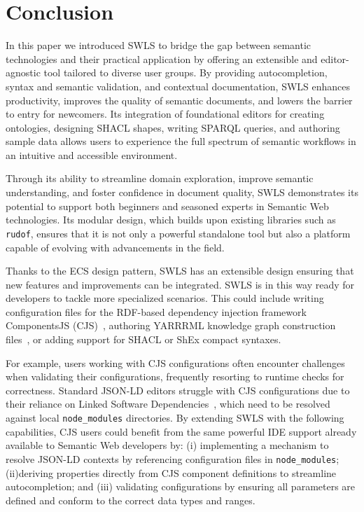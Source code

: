 \section{Conclusion}%
\label{sec:conclusion}

In this paper we introduced SWLS to bridge the gap between semantic technologies and their practical application by offering an extensible and editor-agnostic tool tailored to diverse user groups.
By providing autocompletion, syntax and semantic validation, and contextual documentation, SWLS enhances productivity, improves the quality of semantic documents, and lowers the barrier to entry for newcomers.
Its integration of foundational editors for creating ontologies, designing SHACL shapes, writing SPARQL queries, and authoring sample data allows users to experience the full spectrum of semantic workflows in an intuitive and accessible environment.

Through its ability to streamline domain exploration, improve semantic understanding, and foster confidence in document quality, SWLS demonstrates its potential to support both beginners and seasoned experts in Semantic Web technologies.
Its modular design, which builds upon existing libraries such as \texttt{rudof}, ensures that it is not only a powerful standalone tool but also a platform capable of evolving with advancements in the field.

Thanks to the ECS design pattern, SWLS has an extensible design ensuring that new features and improvements can be integrated.
SWLS is in this way ready for developers to tackle more specialized scenarios.
This could include writing configuration files for the RDF-based dependency injection framework ComponentsJS (CJS)~\cite{01GPAWNQ5ZS2DAY0J9JMPQHM9C}, authoring YARRRML knowledge graph construction files~\cite{Heyvaert2018Declarative}, or adding support for SHACL or ShEx compact syntaxes.

For example, users working with CJS configurations often encounter challenges when validating their configurations, frequently resorting to runtime checks for correctness.
Standard JSON-LD editors struggle with CJS configurations due to their reliance on Linked Software Dependencies~\cite{CJS2}, which need to be resolved against local \texttt{node\_modules} directories.
By extending SWLS with the following capabilities, CJS users could benefit from the same powerful IDE support already available to Semantic Web developers by: (i) implementing a mechanism to resolve JSON-LD contexts by referencing configuration files in \texttt{node\_modules}; (ii)deriving properties directly from CJS component definitions to streamline autocompletion; and (iii) validating configurations by ensuring all parameters are defined and conform to the correct data types and ranges.

